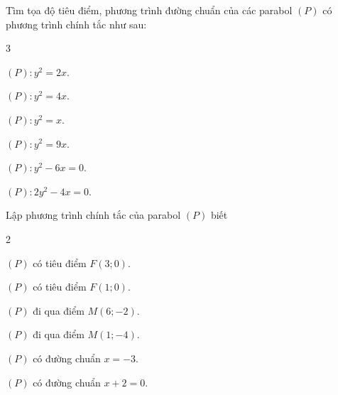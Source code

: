 \begin{vd}
	Tìm tọa độ tiêu điểm, phương trình đường chuẩn của các parabol $(P)$ có phương trình chính tắc như sau:
	\begin{enumEX}[a)]{3}
		\item $(P) \colon y^2=2x$.
		\item $(P) \colon y^2=4x$.
		\item $(P) \colon y^2=x$.
		\item $(P) \colon y^2=9x$.
		\item $(P) \colon y^2-6x=0$.
		\item $(P) \colon 2y^2-4x=0$.
	\end{enumEX}
	\loigiai{}
\end{vd}
\begin{vd}
	Lập phương trình chính tắc của parabol $(P)$ biết
	\begin{enumEX}[a)]{2}
		\item $(P)$ có tiêu điểm $F(3 ; 0)$.
		\item $(P)$ có tiêu điểm $F(1 ; 0)$.
		\item $(P)$ đi qua điểm $M(6 ;-2)$.
		\item $(P)$ đi qua điểm $M(1 ;-4)$.
		\item $(P)$ có đường chuẩn $x=-3$.
		\item $(P)$ có đường chuẩn $x+2=0$.
	\end{enumEX}
	\loigiai{}
\end{vd}

